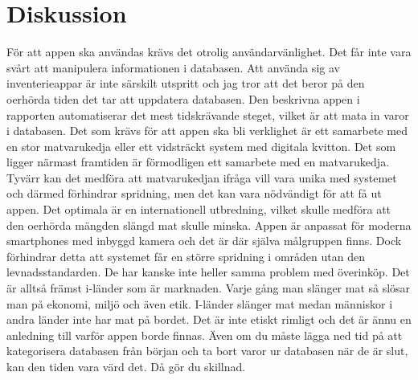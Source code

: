 \documentclass[12pt, a4paper]{article}
\begin{document}
\section{Diskussion}
För att appen ska användas krävs det otrolig användarvänlighet. Det får inte vara svårt att manipulera informationen i databasen. Att använda sig av inventerieappar är inte särskilt utspritt och jag tror att det beror på den oerhörda tiden det tar att uppdatera databasen. Den beskrivna appen i rapporten automatiserar det mest tidskrävande steget, vilket är att mata in varor i databasen.
\noindent \newline \newline
Det som krävs för att appen ska bli verklighet är ett samarbete med en stor matvarukedja eller ett vidsträckt system med digitala kvitton. Det som ligger närmast framtiden är förmodligen ett samarbete med en matvarukedja. Tyvärr kan det medföra att matvarukedjan ifråga vill vara unika med systemet och därmed förhindrar spridning, men det kan vara nödvändigt för att få ut appen. Det optimala är en internationell utbredning, vilket skulle medföra att den oerhörda mängden slängd mat skulle minska.
\noindent \newline \newline
Appen är anpassat för moderna smartphones med inbyggd kamera och det är där själva målgruppen finns.  Dock förhindrar detta att systemet får en större spridning i områden utan den levnadsstandarden. De har kanske inte heller samma problem med överinköp. Det är alltså främst  i-länder som är marknaden. 
\noindent \newline \newline
Varje gång man slänger mat så slösar man på ekonomi, miljö och även etik. I-länder slänger mat medan människor i andra länder inte har mat på bordet. Det är inte etiskt rimligt och det är ännu en anledning till varför appen borde finnas. Även om du måste lägga ned tid på att kategorisera databasen från början och ta bort varor ur databasen när de är slut, kan den tiden vara värd det. Då gör du skillnad. 

  
\end{document}
